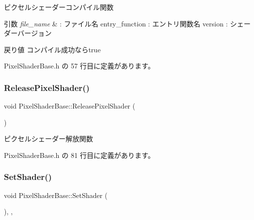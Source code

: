 ピクセルシェーダーコンパイル関数 


\begin{DoxyParams}{引数}
{\em file\+\_\+name} & \+: ファイル名 entry\+\_\+function \+: エントリ関数名 version \+: シェーダーバージョン \\
\hline
\end{DoxyParams}
\begin{DoxyReturn}{戻り値}
コンパイル成功ならtrue 
\end{DoxyReturn}


 Pixel\+Shader\+Base.\+h の 57 行目に定義があります。

\mbox{\label{class_pixel_shader_base_a8e00c19f5ece0a08762442f355195591}} 
\subsubsection{\texorpdfstring{Release\+Pixel\+Shader()}{ReleasePixelShader()}}
{\footnotesize\ttfamily void Pixel\+Shader\+Base\+::\+Release\+Pixel\+Shader (\begin{DoxyParamCaption}{ }\end{DoxyParamCaption})\hspace{0.3cm}{\ttfamily [inline]}}



ピクセルシェーダー解放関数 



 Pixel\+Shader\+Base.\+h の 81 行目に定義があります。

\mbox{\label{class_pixel_shader_base_a73f41bda5cbb9309ad415cdc471954a2}} 
\subsubsection{\texorpdfstring{Set\+Shader()}{SetShader()}}
{\footnotesize\ttfamily void Pixel\+Shader\+Base\+::\+Set\+Shader (\begin{DoxyParamCaption}{ }\end{DoxyParamCaption})\hspace{0.3cm}{\ttfamily [inline]}, {\ttfamily [override]}, {\ttfamily [virtual]}}



